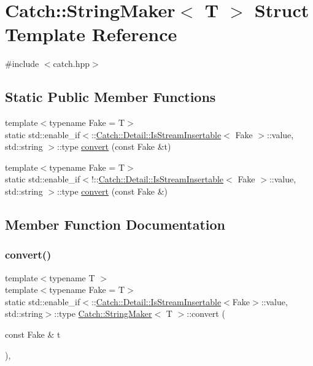 \hypertarget{structCatch_1_1StringMaker}{}\section{Catch\+:\+:String\+Maker$<$ T $>$ Struct Template Reference}
\label{structCatch_1_1StringMaker}


{\ttfamily \#include $<$catch.\+hpp$>$}

\subsection*{Static Public Member Functions}
\begin{DoxyCompactItemize}
\item 
{\footnotesize template$<$typename Fake  = T$>$ }\\static std\+::enable\+\_\+if$<$\+::\mbox{\hyperlink{classCatch_1_1Detail_1_1IsStreamInsertable}{Catch\+::\+Detail\+::\+Is\+Stream\+Insertable}}$<$ Fake $>$\+::value, std\+::string $>$\+::type \mbox{\hyperlink{structCatch_1_1StringMaker_a47d65f42752d9e51c994b1b3b662959c}{convert}} (const Fake \&t)
\item 
{\footnotesize template$<$typename Fake  = T$>$ }\\static std\+::enable\+\_\+if$<$!\+::\mbox{\hyperlink{classCatch_1_1Detail_1_1IsStreamInsertable}{Catch\+::\+Detail\+::\+Is\+Stream\+Insertable}}$<$ Fake $>$\+::value, std\+::string $>$\+::type \mbox{\hyperlink{structCatch_1_1StringMaker_abbf104b351212b453b79196523f1a96e}{convert}} (const Fake \&)
\end{DoxyCompactItemize}


\subsection{Member Function Documentation}
\mbox{\label{structCatch_1_1StringMaker_a47d65f42752d9e51c994b1b3b662959c}} 
\subsubsection{\texorpdfstring{convert()}{convert()}\hspace{0.1cm}{\footnotesize\ttfamily [1/2]}}
{\footnotesize\ttfamily template$<$typename T $>$ \\
template$<$typename Fake  = T$>$ \\
static std\+::enable\+\_\+if$<$\+::\mbox{\hyperlink{classCatch_1_1Detail_1_1IsStreamInsertable}{Catch\+::\+Detail\+::\+Is\+Stream\+Insertable}}$<$Fake$>$\+::value, std\+::string$>$\+::type \mbox{\hyperlink{structCatch_1_1StringMaker}{Catch\+::\+String\+Maker}}$<$ T $>$\+::convert (\begin{DoxyParamCaption}\item[{const Fake \&}]{t }\end{DoxyParamCaption})\hspace{0.3cm}{\ttfamily [inline]}, {\ttfamily [static]}}

